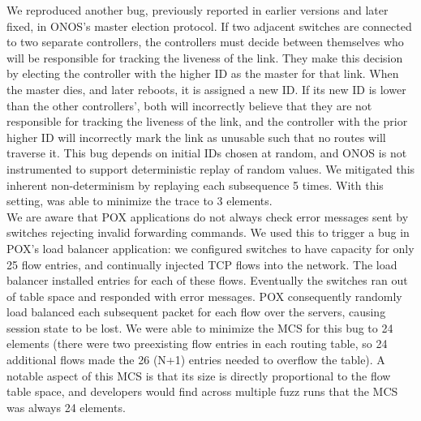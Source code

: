  We reproduced another bug,
previously reported in earlier versions and later fixed, in
ONOS's master election protocol. If two adjacent switches are connected to two
separate controllers, the controllers must decide between themselves who will
be responsible for tracking the liveness of the link. They make this decision
by electing the controller with the higher ID as the master for that link.
When the master dies, and later reboots, it is assigned a new ID. If
its new ID is lower than the other controllers', both will incorrectly
believe that they are not responsible for tracking the liveness of the link,
and the controller with the prior higher ID will incorrectly mark the link as
unusable such that no routes will traverse it. This bug depends on
initial IDs chosen at random, and ONOS is not instrumented to
support deterministic replay of random values. We mitigated this
inherent non-determinism by replaying each subsequence 5 times. With this setting,
\projectname{} was able to minimize the trace to 3 elements.\\[0.5ex]
 We are aware that POX
applications do not always check error messages sent by switches
rejecting invalid forwarding commands. We used this to trigger a bug in
POX's load balancer application: we configured switches to have
capacity for only
25 flow entries, and continually injected TCP flows
into the network. The load balancer installed entries
for each of these flows. Eventually the switches ran out of table
space and responded with error messages. POX consequently randomly load
balanced each subsequent packet for each flow over the servers, causing
session state to be lost. We were able to minimize the MCS for this
bug to 24 elements (there were two preexisting flow entries in each
routing table, so 24 additional flows made the 26 (N+1) entries needed to
overflow the table). A notable aspect of this MCS is that its size is directly
proportional to the flow table space, and developers would find across multiple
fuzz runs that the MCS was always 24 elements.

